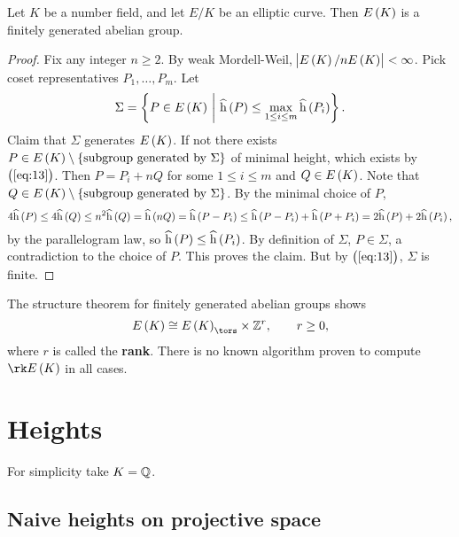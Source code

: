 \begin{theorem}
Let $ K $ be a number field, and let $ E / K $ be an elliptic curve. Then $ E\br{K} $ is a finitely generated abelian group.
\end{theorem}

\begin{proof}
Fix any integer $ n \ge 2 $. By weak Mordell-Weil, $ \abs{E\br{K} / nE\br{K}} < \infty $. Pick coset representatives $ P_1, \dots, P_m $. Let
$$ \Sigma = \cbr{P \in E\br{K} \st \widehat{\h}\br{P} \le \max_{1 \le i \le m} \widehat{\h}\br{P_i}}. $$
Claim that $ \Sigma $ generates $ E\br{K} $. If not there exists $ P \in E\br{K} \setminus \cbr{\text{subgroup generated by} \ \Sigma} $ of minimal height, which exists by $ \br{\ref{eq:13}} $. Then $ P = P_i + nQ $ for some $ 1 \le i \le m $ and $ Q \in E\br{K} $. Note that $ Q \in E\br{K} \setminus \cbr{\text{subgroup generated by} \ \Sigma} $. By the minimal choice of $ P $,
$$ 4\widehat{\h}\br{P} \le 4\widehat{\h}\br{Q} \le n^2\widehat{\h}\br{Q} = \widehat{\h}\br{nQ} = \widehat{\h}\br{P - P_i} \le \widehat{\h}\br{P - P_i} + \widehat{\h}\br{P + P_i} = 2\widehat{\h}\br{P} + 2\widehat{\h}\br{P_i}, $$
by the parallelogram law, so $ \widehat{\h}\br{P} \le \widehat{\h}\br{P_i} $. By definition of $ \Sigma $, $ P \in \Sigma $, a contradiction to the choice of $ P $. This proves the claim. But by $ \br{\ref{eq:13}} $, $ \Sigma $ is finite.
\end{proof}


\begin{remark*}
The structure theorem for finitely generated abelian groups shows
$$ E\br{K} \cong E\br{K}_{\tors} \times \ZZ^r, \qquad r \ge 0, $$
where $ r $ is called the \textbf{rank}. There is no known algorithm proven to compute $ \rk E\br{K} $ in all cases.
\end{remark*}

\pagebreak

\section{Heights}

For simplicity take $ K = \mathbb{Q} $.

\subsection{Naive heights on projective space}

